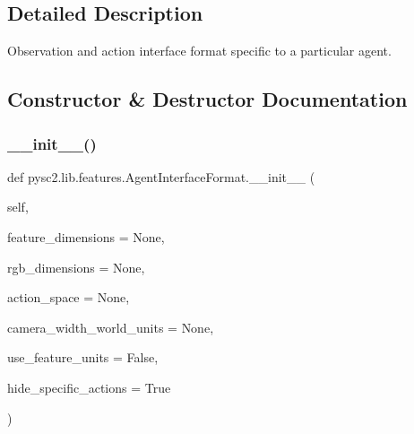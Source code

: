 \subsection{Detailed Description}
\begin{DoxyVerb}Observation and action interface format specific to a particular agent.\end{DoxyVerb}
 

\subsection{Constructor \& Destructor Documentation}
\mbox{\label{classpysc2_1_1lib_1_1features_1_1_agent_interface_format_a80c173fac4f02ee090925b0ba2eaa369}} 
\subsubsection{\texorpdfstring{\+\_\+\+\_\+init\+\_\+\+\_\+()}{\_\_init\_\_()}}
{\footnotesize\ttfamily def pysc2.\+lib.\+features.\+Agent\+Interface\+Format.\+\_\+\+\_\+init\+\_\+\+\_\+ (\begin{DoxyParamCaption}\item[{}]{self,  }\item[{}]{feature\+\_\+dimensions = {\ttfamily None},  }\item[{}]{rgb\+\_\+dimensions = {\ttfamily None},  }\item[{}]{action\+\_\+space = {\ttfamily None},  }\item[{}]{camera\+\_\+width\+\_\+world\+\_\+units = {\ttfamily None},  }\item[{}]{use\+\_\+feature\+\_\+units = {\ttfamily False},  }\item[{}]{hide\+\_\+specific\+\_\+actions = {\ttfamily True} }\end{DoxyParamCaption})}

